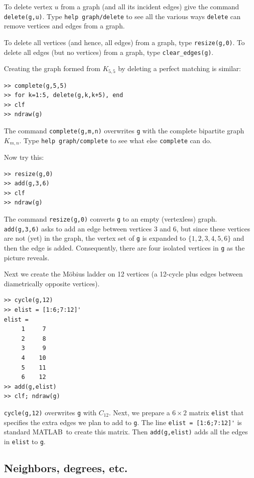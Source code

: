 \documentclass[12pt]{amsart}
\newcommand\matlab{MATLAB}
\begin{document}
To delete vertex $u$ from a graph (and all its incident edges)
give the command \verb|delete(g,u)|. Type \verb|help graph/delete| to
see all the various ways \verb|delete| can remove vertices and edges
from a graph. 

To delete all vertices (and hence, all edges) from a graph, type
\verb|resize(g,0)|. To delete all edges (but no vertices) from a
graph, type \verb|clear_edges(g)|. 

\medbreak 

Creating the graph formed from $K_{5,5}$ by deleting a perfect
matching is similar:
\begin{verbatim}
>> complete(g,5,5)
>> for k=1:5, delete(g,k,k+5), end
>> clf
>> ndraw(g)
\end{verbatim}
The command \verb|complete(g,m,n)| overwrites \verb|g| with the
complete bipartite graph $K_{m,n}$. Type \verb|help graph/complete| to
see what else \verb|complete| can do.

\medbreak

Now try this:
\begin{verbatim}
>> resize(g,0)
>> add(g,3,6)
>> clf
>> ndraw(g)
\end{verbatim}
The command \verb|resize(g,0)| converts \verb|g| to an empty
(vertexless) graph. \verb|add(g,3,6)| asks to add an edge between
vertices 3 and 6, but since these vertices are not (yet) in the graph,
the vertex set of \verb|g| is expanded to $\{1,2,3,4,5,6\}$ and then
the edge is added. Consequently, there are four isolated vertices in
\verb|g| as the picture reveals.

\medbreak
Next we create the M\"obius ladder on 12 vertices (a 12-cycle
plus edges between diametrically opposite vertices). 
\begin{verbatim}
>> cycle(g,12)
>> elist = [1:6;7:12]'
elist =
     1     7
     2     8
     3     9
     4    10
     5    11
     6    12
>> add(g,elist)
>> clf; ndraw(g)
\end{verbatim}
\verb|cycle(g,12)| overwrites \verb|g| with $C_{12}$. Next, we prepare
a $6\times2$ matrix \verb|elist| that specifies the extra edges we
plan to add to \verb|g|. The line \verb|elist = [1:6;7:12]'| is
standard \matlab\ to create this matrix. Then \verb|add(g,elist)| adds
all the edges in \verb|elist| to \verb|g|.


\subsection{Neighbors, degrees, etc.}
\end{document}
